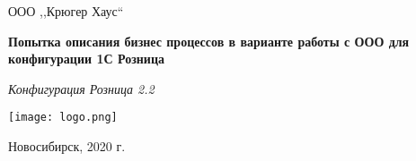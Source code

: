 \begin{titlepage}
\begin{center}
\large
ООО  ,,Крюгер Хаус``


\vspace{2.25cm}

\textbf{Попытка описания бизнес процессов в варианте работы с ООО для конфигурации 1С Розница } 

\textit{Конфигурация Розница 2.2}
\vfill    

{\texttt{[image: logo.png]}}  

\end{center}
\vfill

\newlength{\ML}


\begin{center}
Новосибирск, 2020 г.
\end{center}
\end{titlepage}